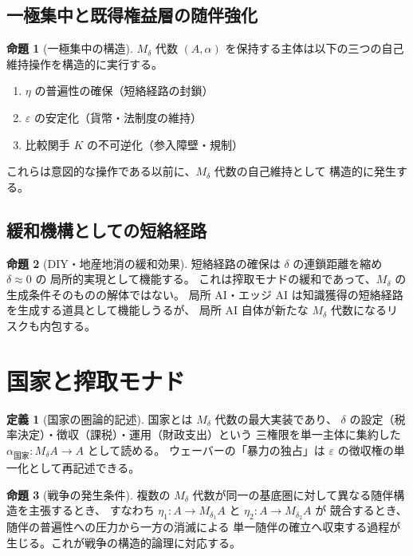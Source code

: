 \documentclass[11pt,a4paper]{ltjsarticle}
\newcommand{\Mdelta}{M_\delta}
\theoremstyle{definition}
\newtheorem{definition}{定義}[section]
\newtheorem{proposition}{命題}[section]
\begin{document}
\subsection{一極集中と既得権益層の随伴強化}

\begin{proposition}[一極集中の構造]
$\Mdelta$ 代数 $(A, \alpha)$ を保持する主体は以下の三つの自己維持操作を構造的に実行する。
\begin{enumerate}
\item $\eta$ の普遍性の確保（短絡経路の封鎖）
\item $\varepsilon$ の安定化（貨幣・法制度の維持）
\item 比較関手 $K$ の不可逆化（参入障壁・規制）
\end{enumerate}
これらは意図的な操作である以前に、$\Mdelta$ 代数の自己維持として
構造的に発生する。
\end{proposition}

\subsection{緩和機構としての短絡経路}

\begin{proposition}[DIY・地産地消の緩和効果]
短絡経路の確保は $\delta$ の連鎖距離を縮め $\delta \approx 0$ の
局所的実現として機能する。
これは搾取モナドの緩和であって、$\Mdelta$ の生成条件そのものの解体ではない。
局所 AI・エッジ AI は知識獲得の短絡経路を生成する道具として機能しうるが、
局所 AI 自体が新たな $\Mdelta$ 代数になるリスクも内包する。
\end{proposition}

\section{国家と搾取モナド}

\begin{definition}[国家の圏論的記述]
国家とは $\Mdelta$ 代数の最大実装であり、
$\delta$ の設定（税率決定）・徴収（課税）・運用（財政支出）という
三権限を単一主体に集約した $\alpha_{\text{国家}}: \Mdelta A \to A$ として読める。
ウェーバーの「暴力の独占」は $\varepsilon$ の徴収権の単一化として再記述できる。
\end{definition}

\begin{proposition}[戦争の発生条件]
複数の $\Mdelta$ 代数が同一の基底圏に対して異なる随伴構造を主張するとき、
すなわち $\eta_1: A \to M_{\delta_1}A$ と $\eta_2: A \to M_{\delta_2}A$ が
競合するとき、随伴の普遍性への圧力から一方の消滅による
単一随伴の確立へ収束する過程が生じる。これが戦争の構造的論理に対応する。
\end{proposition}
\end{document}
